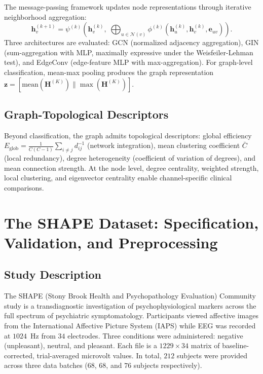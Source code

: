 The message-passing framework \cite{Gilmer2017} updates node representations through iterative neighborhood aggregation:
\begin{equation}
    \mathbf{h}_v^{(k+1)} = \psi^{(k)}\!\left(\mathbf{h}_v^{(k)},\; \bigoplus_{u \in \mathcal{N}(v)} \phi^{(k)}\!\left(\mathbf{h}_u^{(k)}, \mathbf{h}_v^{(k)}, \mathbf{e}_{uv}\right)\right).
\end{equation}
Three architectures are evaluated: GCN \cite{Kipf2017} (normalized adjacency aggregation), GIN \cite{Xu2019} (sum-aggregation with MLP, maximally expressive under the Weisfeiler-Lehman test), and EdgeConv \cite{Wang2019HeterogeneousGNN} (edge-feature MLP with max-aggregation). For graph-level classification, mean-max pooling produces the graph representation $\mathbf{z} = [\text{mean}(\mathbf{H}^{(K)}) \| \max(\mathbf{H}^{(K)})]$.

\subsection{Graph-Topological Descriptors}

Beyond classification, the graph admits topological descriptors: global efficiency $E_{\text{glob}} = \frac{1}{C(C-1)} \sum_{i \neq j} d_{ij}^{-1}$ (network integration), mean clustering coefficient $\bar{C}$ (local redundancy), degree heterogeneity (coefficient of variation of degrees), and mean connection strength. At the node level, degree centrality, weighted strength, local clustering, and eigenvector centrality enable channel-specific clinical comparisons.


\section{The SHAPE Dataset: Specification, Validation, and Preprocessing}
\label{sec:ch5_dataset}

\subsection{Study Description}

The SHAPE (Stony Brook Health and Psychopathology Evaluation) Community study is a transdiagnostic investigation of psychophysiological markers across the full spectrum of psychiatric symptomatology. Participants viewed affective images from the International Affective Picture System (IAPS) \cite{lang_iaps_2008} while EEG was recorded at $1024$~Hz from $34$ electrodes. Three conditions were administered: negative (unpleasant), neutral, and pleasant. Each file is a $1229 \times 34$ matrix of baseline-corrected, trial-averaged microvolt values. In total, $212$ subjects were provided across three data batches ($68$, $68$, and $76$ subjects respectively).

